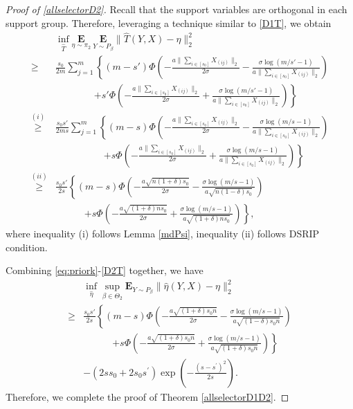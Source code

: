 \documentclass[12pt]{article}
\newtheorem{proof}{Proof}
\begin{document}
\begin{appendix}
\begin{proof}[Proof of \eqref{allselectorD2}]
Recall that the support variables are orthogonal in each support group.
Therefore, leveraging a technique similar to \eqref{D1T}, we obtain
\begin{equation}\label{D2T}
\begin{aligned}
&\inf_{\hat T }\underset{\eta \sim \pi_2}{\mathbf E} ~
   \underset{Y \sim P_\beta}{\mathbf E} \|\hat T(Y,X) - \eta\|_2^2 \\
\ge& \frac{s_0}{2m}\sum_{j=1}^m \left\{ (m-s'){\Phi}\left(-\frac{a \|\sum_{i\in[s_0]}X_{(ij)}\|_2}{2\sigma}-\frac{\sigma \log(m/s'-1)}{a\|\sum_{i\in[s_0]}X_{(ij)}\|_2 } \right)  \right.\\
  & \quad\quad\quad\quad \left.+ s'{\Phi}\left(-\frac{a \|\sum_{i\in[s_0]}X_{(ij)}\|_2 }{2\sigma} + \frac{\sigma \log(m/s'-1)}{a \|\sum_{i\in[s_0]}X_{(ij)}\|_2 } \right) \right\}\\ 
\overset{(i)}{\ge}& \frac{s_0 s'}{2m s}\sum_{j=1}^m \left\{ (m-s){\Phi}\left(-\frac{a \|\sum_{i\in[s_0]}X_{(ij)}\|_2}{2\sigma}-\frac{\sigma \log(m/s-1)}{a\|\sum_{i\in[s_0]}X_{(ij)}\|_2 } \right)  \right.\\
  & \quad\quad\quad\qquad \left.+ s{\Phi}\left(-\frac{a \|\sum_{i\in[s_0]}X_{(ij)}\|_2 }{2\sigma} + \frac{\sigma \log(m/s-1)}{a \|\sum_{i\in[s_0]}X_{(ij)}\|_2 } \right) \right\}\\ 
\overset{(ii)}{\ge}& \frac{ s_0 s'}{2s} \left\{ (m-s) {\Phi}\left(-\frac{a \sqrt{n(1+\delta)s_0}}{2\sigma}-\frac{\sigma \log(m/s-1)}{a\sqrt{n(1-\delta)s_0}} \right) \right.\\
& \qquad\quad \left.+  s {\Phi}\left(-\frac{a \sqrt{(1+\delta)ns_0}}{2\sigma}+\frac{\sigma \log(m/s-1) }{a\sqrt{(1+\delta)ns_0}}\right) \right\} ,
\end{aligned}
\end{equation}
where inequality (i) follows Lemma \ref{mdPsi}, inequality (ii) follows DSRIP condition.

Combining \eqref{eq:priork}-\eqref{D2T} together, we have
\begin{equation}
\begin{aligned}
& \inf_{\hat \eta} \sup_{\beta \in {\Theta}_2} \mathbf{E}_{Y\sim P_\beta} \|\hat \eta(Y,X) - \eta \|_2^2 \\
\ge& \frac{s_0s'}{2s}\left\{  (m-s) {\Phi}\left(-\frac{a\sqrt{(1+\delta)s_0n}}{2\sigma} -
     \frac{\sigma \log(m/s-1)}{a\sqrt{(1-\delta)s_0 n}} \right) \right.  \\
     & \qquad\quad \left. +s {\Phi}\left(-\frac{a\sqrt{(1+\delta)s_0n}}{2\sigma} + 
     \frac{\sigma \log(m/s-1)}{a\sqrt{(1+\delta)s_0 n}} \right) \right\} \\
    &- (2ss_0+2s_0s^\prime)\exp\left(-\frac{(s-s^\prime)^2}{2s} \right).
\end{aligned}
\end{equation}
Therefore, we complete the proof of Theorem \ref{allselectorD1D2}.
\end{proof}


\end{appendix}
\end{document}
